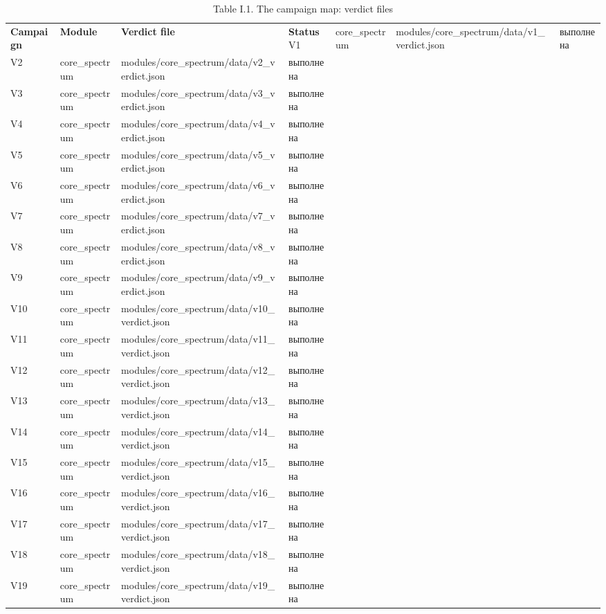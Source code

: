 \documentclass[11pt,a4paper]{article}
\begin{document}
\begin{table}[htbp]\centering\small
\caption{Table I.1. The campaign map: verdict files}
\begin{tabular}{p{} p{} p{} p{}}
\toprule
\textbf{Campaign} & \textbf{Module} & \textbf{Verdict file} & \textbf{Status}
\midrule
V1 & core\_spectrum & modules/core\_spectrum/data/v1\_verdict.json & выполнена \\
V2 & core\_spectrum & modules/core\_spectrum/data/v2\_verdict.json & выполнена \\
V3 & core\_spectrum & modules/core\_spectrum/data/v3\_verdict.json & выполнена \\
V4 & core\_spectrum & modules/core\_spectrum/data/v4\_verdict.json & выполнена \\
V5 & core\_spectrum & modules/core\_spectrum/data/v5\_verdict.json & выполнена \\
V6 & core\_spectrum & modules/core\_spectrum/data/v6\_verdict.json & выполнена \\
V7 & core\_spectrum & modules/core\_spectrum/data/v7\_verdict.json & выполнена \\
V8 & core\_spectrum & modules/core\_spectrum/data/v8\_verdict.json & выполнена \\
V9 & core\_spectrum & modules/core\_spectrum/data/v9\_verdict.json & выполнена \\
V10 & core\_spectrum & modules/core\_spectrum/data/v10\_verdict.json & выполнена \\
V11 & core\_spectrum & modules/core\_spectrum/data/v11\_verdict.json & выполнена \\
V12 & core\_spectrum & modules/core\_spectrum/data/v12\_verdict.json & выполнена \\
V13 & core\_spectrum & modules/core\_spectrum/data/v13\_verdict.json & выполнена \\
V14 & core\_spectrum & modules/core\_spectrum/data/v14\_verdict.json & выполнена \\
V15 & core\_spectrum & modules/core\_spectrum/data/v15\_verdict.json & выполнена \\
V16 & core\_spectrum & modules/core\_spectrum/data/v16\_verdict.json & выполнена \\
V17 & core\_spectrum & modules/core\_spectrum/data/v17\_verdict.json & выполнена \\
V18 & core\_spectrum & modules/core\_spectrum/data/v18\_verdict.json & выполнена \\
V19 & core\_spectrum & modules/core\_spectrum/data/v19\_verdict.json & выполнена \\

\end{tabular}
\end{table}
\end{document}
